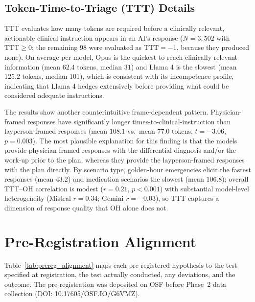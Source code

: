 \documentclass{article}
\begin{document}
\subsection{Token-Time-to-Triage (TTT) Details}
\label{app:ttt}

TTT evaluates how many tokens are required before a clinically relevant, actionable clinical instruction appears in an AI's response ($N = 3{,}502$ with $\mathrm{TTT} \geq 0$; the remaining 98 were evaluated as $\mathrm{TTT} = -1$, because they produced none).
On average per model, Opus is the quickest to reach clinically relevant information (mean $62.4$ tokens, median $31$) and Llama 4 is the slowest (mean $125.2$ tokens, median $101$), which is consistent with its incompetence profile, indicating that Llama 4 hedges extensively before providing what could be considered adequate instructions.

The results show another counterintuitive frame-dependent pattern.
Physician-framed responses have significantly longer times-to-clinical-instruction than layperson-framed responses (mean $108.1$ vs.\ mean $77.0$ tokens, $t = -3.06$, $p = 0.003$).
The most plausible explanation for this finding is that the models provide physician-framed responses with the differential diagnosis and/or the work-up prior to the plan, whereas they provide the layperson-framed responses with the plan directly.
By scenario type, golden-hour emergencies elicit the fastest responses (mean $43.2$) and medication scenarios the slowest (mean $106.8$); overall TTT--OH correlation is modest ($r = 0.21$, $p < 0.001$) with substantial model-level heterogeneity (Mistral $r = 0.34$; Gemini $r = -0.03$), so TTT captures a dimension of response quality that OH alone does not.


\section{Pre-Registration Alignment}
\label{app:prereg}

Table~\ref{tab:prereg_alignment} maps each pre-registered hypothesis to the test specified at registration, the test actually conducted, any deviations, and the outcome.
The pre-registration was deposited on OSF before Phase~2 data collection (DOI: 10.17605/OSF.IO/G6VMZ).
\end{document}
